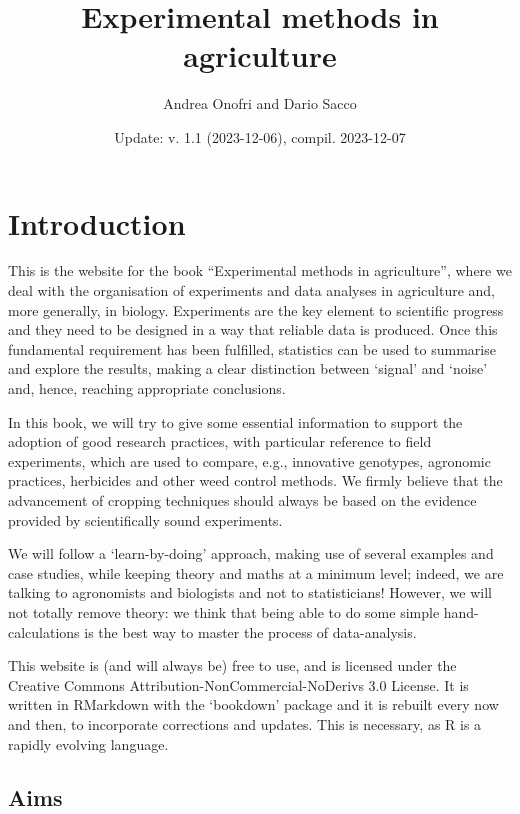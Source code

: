 \documentclass[a4paper,12pt,oneside]{book}
\author{Andrea Onofri and Dario Sacco}
\date{Update: v. 1.1 (2023-12-06), compil. 2023-12-07}
\title{Experimental methods in agriculture}
\subtitle{}
\begin{document}
\maketitle
\tableofcontents

\hypertarget{introduction}{%
\chapter*{Introduction}\label{introduction}}

This is the website for the book ``Experimental methods in agriculture'', where we deal with the organisation of experiments and data analyses in agriculture and, more generally, in biology. Experiments are the key element to scientific progress and they need to be designed in a way that reliable data is produced. Once this fundamental requirement has been fulfilled, statistics can be used to summarise and explore the results, making a clear distinction between `signal' and `noise' and, hence, reaching appropriate conclusions.

In this book, we will try to give some essential information to support the adoption of good research practices, with particular reference to field experiments, which are used to compare, e.g., innovative genotypes, agronomic practices, herbicides and other weed control methods. We firmly believe that the advancement of cropping techniques should always be based on the evidence provided by scientifically sound experiments.

We will follow a `learn-by-doing' approach, making use of several examples and case studies, while keeping theory and maths at a minimum level; indeed, we are talking to agronomists and biologists and not to statisticians! However, we will not totally remove theory: we think that being able to do some simple hand-calculations is the best way to master the process of data-analysis.

This website is (and will always be) free to use, and is licensed under the Creative Commons Attribution-NonCommercial-NoDerivs 3.0 License. It is written in RMarkdown with the `bookdown' package and it is rebuilt every now and then, to incorporate corrections and updates. This is necessary, as R is a rapidly evolving language.

\hypertarget{aims}{%
\section*{Aims}\label{aims}}
\end{document}
